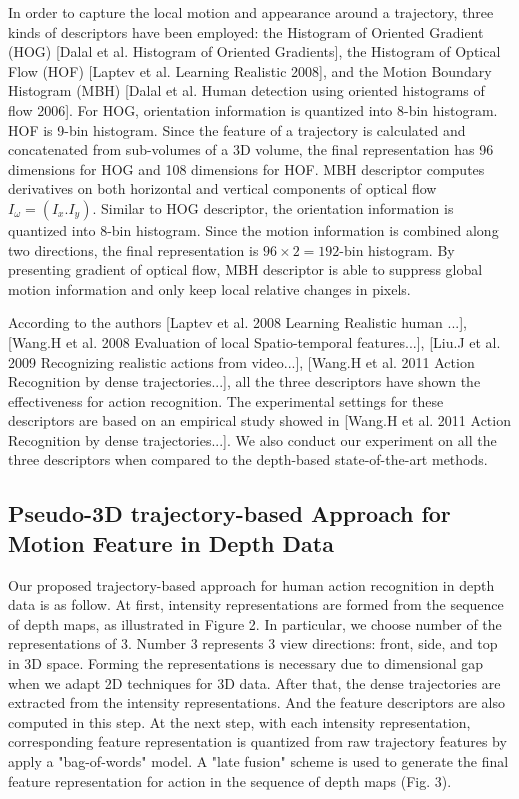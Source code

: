 \documentclass[review]{elsarticle}
\begin{document}
In order to capture the local motion and appearance around a trajectory, three kinds of descriptors have been employed: the Histogram of Oriented Gradient (HOG) [Dalal et al. Histogram of Oriented Gradients], the Histogram of Optical Flow (HOF) [Laptev et al. Learning Realistic 2008], and the Motion Boundary Histogram (MBH) [Dalal et al. Human detection using oriented histograms of flow 2006]. For HOG, orientation information is quantized into 8-bin histogram. HOF is 9-bin histogram. Since the feature of a trajectory is calculated and concatenated from sub-volumes of a 3D volume, the final representation has 96 dimensions for HOG and 108 dimensions for HOF. MBH descriptor computes derivatives on both horizontal and vertical components of optical flow $I_\omega = (I_x. I_y)$. Similar to HOG descriptor, the orientation information is quantized into 8-bin histogram. Since the motion information is combined along two directions, the final representation is $96 \times 2 = 192$-bin histogram. By presenting gradient of optical flow, MBH descriptor is able to suppress global motion information and only keep local relative changes in pixels.

According to the authors [Laptev et al. 2008 Learning Realistic human ...], [Wang.H et al. 2008 Evaluation of local Spatio-temporal features...], [Liu.J et al. 2009 Recognizing realistic actions from video...], [Wang.H et al. 2011 Action Recognition by dense trajectories...], all the three descriptors have shown the effectiveness for action recognition. The experimental settings for these descriptors are based on an empirical study showed in [Wang.H et al. 2011 Action Recognition by dense trajectories...]. We also conduct our experiment on all the three descriptors when compared to the depth-based state-of-the-art methods.

\subsection{Pseudo-3D trajectory-based Approach for Motion Feature in Depth Data}

Our proposed trajectory-based approach for human action recognition in depth data is as follow. At first, intensity representations are formed from the sequence of depth maps, as illustrated in Figure 2. In particular, we choose number of the representations of 3. Number 3 represents 3 view directions: front, side, and top in 3D space. Forming the representations is necessary due to dimensional gap when we adapt 2D techniques for 3D data. After that, the dense trajectories are extracted from the intensity representations. And the feature descriptors are also computed in this step. At the next step, with each intensity representation, corresponding feature representation is quantized from raw trajectory features by apply a "bag-of-words" model. A "late fusion" scheme is used to generate the final feature representation for action in the sequence of depth maps (Fig. 3).
\end{document}
